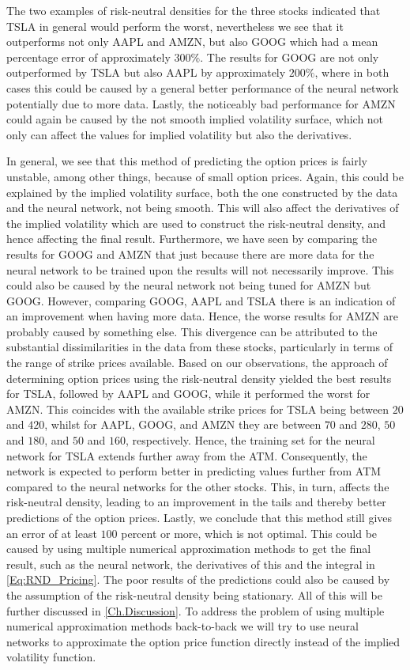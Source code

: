 The two examples of risk-neutral densities for the three stocks indicated that TSLA in general would perform the worst, nevertheless we see that it outperforms not only AAPL and AMZN, but also GOOG which had a mean percentage error of approximately $300\%$. The results for GOOG are not only outperformed by TSLA but also AAPL by approximately $200\%$, where in both cases this could be caused by a general better performance of the neural network potentially due to more data. Lastly, the noticeably bad performance for AMZN could again be caused by the not smooth implied volatility surface, which not only can affect the values for implied volatility but also the derivatives. 

In general, we see that this method of predicting the option prices is fairly unstable, among other things, because of small option prices. Again, this could be explained by the implied volatility surface, both the one constructed by the data and the neural network, not being smooth. This will also affect the derivatives of the implied volatility which are used to construct the risk-neutral density, and hence affecting the final result. Furthermore, we have seen by comparing the results for GOOG and AMZN that just because there are more data for the neural network to be trained upon the results will not necessarily improve. This could also be caused by the neural network not being tuned for AMZN but GOOG. However, comparing GOOG, AAPL and TSLA there is an indication of an improvement when having more data. Hence, the worse results for AMZN are probably caused by something else. This divergence can be attributed to the substantial dissimilarities in the data from these stocks, particularly in terms of the range of strike prices available. Based on our observations, the approach of determining option prices using the risk-neutral density yielded the best results for TSLA, followed by AAPL and GOOG, while it performed the worst for AMZN. This coincides with the available strike prices for TSLA being between $20$ and $420$, whilst for AAPL, GOOG, and AMZN they are between $70$ and $280$, $50$ and $180$, and $50$ and $160$, respectively. Hence, the training set for the neural network for TSLA extends further away from the ATM. Consequently, the network is expected to perform better in predicting values further from ATM compared to the neural networks for the other stocks. This, in turn, affects the risk-neutral density, leading to an improvement in the tails and thereby better predictions of the option prices. Lastly, we conclude that this method still gives an error of at least $100$ percent or more, which is not optimal. This could be caused by using multiple numerical approximation methods to get the final result, such as the neural network, the derivatives of this and the integral in \eqref{Eq:RND_Pricing}. The poor results of the predictions could also be caused by the assumption of the risk-neutral density being stationary. All of this will be further discussed in \autoref{Ch.Discussion}. To address the problem of using multiple numerical approximation methods back-to-back we will try to use neural networks to approximate the option price function directly instead of the implied volatility function. 


 